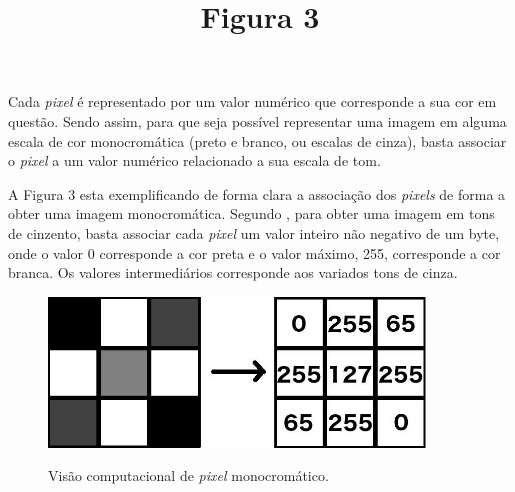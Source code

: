 Cada \textit{pixel} é representado por um valor numérico que corresponde a sua cor em questão. Sendo assim, para que seja possível representar uma imagem em alguma escala de cor monocromática (preto e branco, ou escalas de cinza), basta associar o \textit{pixel} a um valor numérico relacionado a sua escala de tom.

 


A Figura 3 esta exemplificando de forma clara a associação dos \textit{pixels} de forma a obter uma imagem monocromática. Segundo , para obter uma imagem em tons de cinzento, basta associar cada \textit{pixel} um valor inteiro não negativo de um byte, onde o valor 0 corresponde a cor preta e o valor máximo, 255, corresponde a cor branca. Os valores intermediários corresponde aos variados tons de cinza.

\clearpage

\title{Figura 3} 
\date{} %
\maketitle
\begin{figure}[!htb]
\caption{{\footnotesize Visão computacional de \textit{pixel} monocromático.} }
 
\centering %
\includegraphics[width=10cm]{revisao-bibliografica/Figuras/Computer-Vision-Pixel.jpg}%
\label{figura:figura3}

\centering {}
{
\label{figura:figura3}
}
\end{figure}


